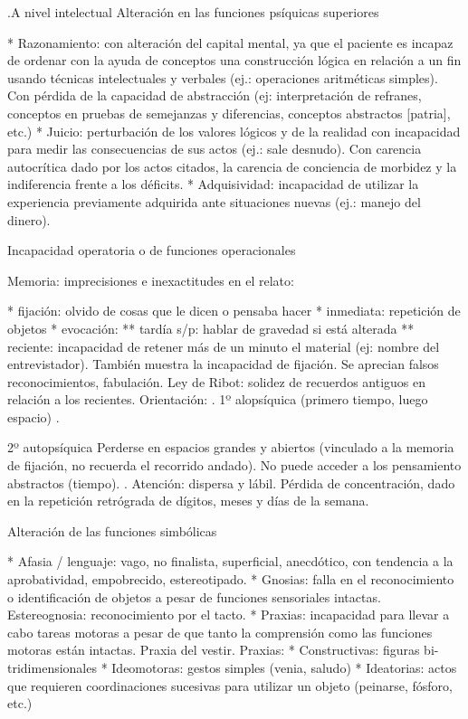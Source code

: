 \documentclass[encares.tex]{subfiles}
\begin{document}
.A nivel intelectual
Alteración en las funciones psíquicas superiores

* Razonamiento: con alteración del capital mental, ya que el paciente es incapaz de ordenar con la ayuda de conceptos una construcción lógica en relación a un fin usando técnicas intelectuales y verbales (ej.: operaciones aritméticas simples). Con pérdida de la capacidad de abstracción (ej: interpretación de refranes, conceptos en pruebas de semejanzas y diferencias, conceptos abstractos [patria], etc.)
* Juicio: perturbación de los valores lógicos y de la realidad con incapacidad para medir las consecuencias de sus actos (ej.: sale desnudo). Con carencia autocrítica dado por los actos citados, la carencia de conciencia de morbidez y la indiferencia frente a los déficits.
* Adquisividad: incapacidad de utilizar la experiencia previamente adquirida ante situaciones nuevas (ej.: manejo del dinero).

Incapacidad operatoria o de funciones operacionales

Memoria: imprecisiones e inexactitudes en el relato:

* fijación: olvido de cosas que le dicen o pensaba hacer
* inmediata: repetición de objetos
* evocación:
** tardía s/p: hablar de gravedad si está alterada
** reciente: incapacidad de retener más de un minuto el material (ej: nombre del entrevistador). También muestra la incapacidad de fijación. Se aprecian falsos reconocimientos, fabulación. Ley de Ribot: solidez de recuerdos antiguos en relación a los recientes. Orientación: . 1º alopsíquica (primero tiempo, luego espacio) .

2º autopsíquica Perderse en espacios grandes y abiertos (vinculado a la memoria de fijación, no recuerda el recorrido andado). No puede acceder a los pensamiento abstractos (tiempo). . Atención: dispersa y lábil. Pérdida de concentración, dado en la repetición retrógrada de dígitos, meses y días de la semana.

Alteración de las funciones simbólicas

* Afasia / lenguaje: vago, no finalista, superficial, anecdótico, con tendencia a la aprobatividad, empobrecido, estereotipado.
* Gnosias: falla en el reconocimiento o identificación de objetos a pesar de funciones sensoriales intactas. Estereognosia: reconocimiento por el tacto.
* Praxias: incapacidad para llevar a cabo tareas motoras a pesar de que tanto la comprensión como las funciones motoras están intactas. Praxia del vestir. Praxias:
* Constructivas: figuras bi-tridimensionales
* Ideomotoras: gestos simples (venia, saludo)
* Ideatorias: actos que requieren coordinaciones sucesivas para utilizar un objeto (peinarse, fósforo, etc.)
\end{document}
